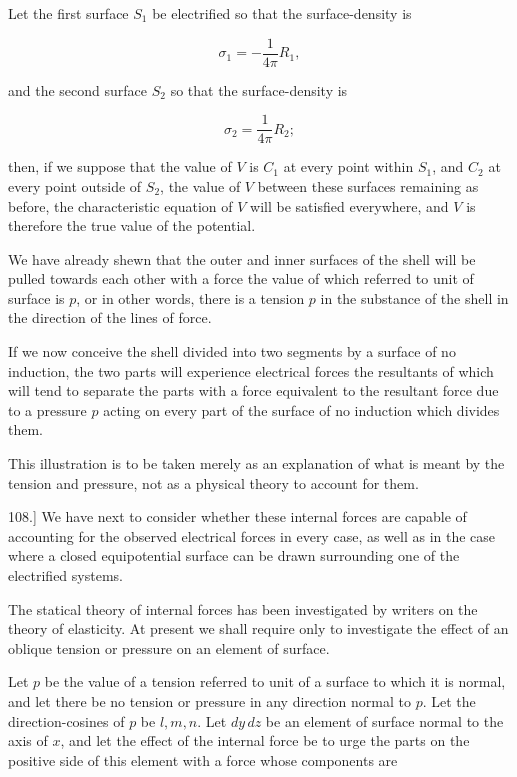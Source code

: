 \documentclass[11pt,a4paper]{article}
\begin{document}
Let the first surface $S_1$ be electrified so that the surface-density is

\[
\sigma_1 = -\frac{1}{4\pi} R_1,
\]

and the second surface $S_2$ so that the surface-density is

\[
\sigma_2 = \frac{1}{4\pi} R_2;
\]

then, if we suppose that the value of $V$ is $C_1$ at every point within $S_1$, and $C_2$ at every point outside of $S_2$, the value of $V$ between these surfaces remaining as before, the characteristic equation of $V$ will be satisfied everywhere, and $V$ is therefore the true value of the potential.

We have already shewn that the outer and inner surfaces of the shell will be pulled towards each other with a force the value of which referred to unit of surface is $p$, or in other words, there is a tension $p$ in the substance of the shell in the direction of the lines of force.

If we now conceive the shell divided into two segments by a surface of no induction, the two parts will experience electrical forces the resultants of which will tend to separate the parts with a force equivalent to the resultant force due to a pressure $p$ acting on every part of the surface of no induction which divides them.

This illustration is to be taken merely as an explanation of what is meant by the tension and pressure, not as a physical theory to account for them.

108.] We have next to consider whether these internal forces are capable of accounting for the observed electrical forces in every case, as well as in the case where a closed equipotential surface can be drawn surrounding one of the electrified systems.

The statical theory of internal forces has been investigated by writers on the theory of elasticity. At present we shall require only to investigate the effect of an oblique tension or pressure on an element of surface.

Let $p$ be the value of a tension referred to unit of a surface to which it is normal, and let there be no tension or pressure in any direction normal to $p$. Let the direction-cosines of $p$ be $l,m,n$. Let $dy\,dz$ be an element of surface normal to the axis of $x$, and let the effect of the internal force be to urge the parts on the positive side of this element with a force whose components are
\end{document}
